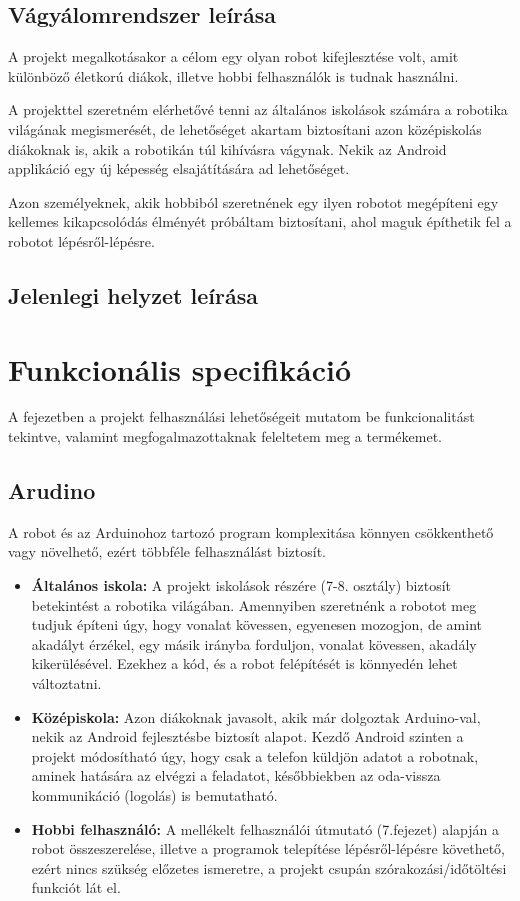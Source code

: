 \documentclass[]{thesis-ekf}
\theoremstyle{definition}
\begin{document}
\section{Vágyálomrendszer leírása}\label{követelmény}
A projekt megalkotásakor a célom egy olyan robot kifejlesztése volt, amit különböző életkorú diákok, illetve hobbi felhasználók is tudnak használni.

A projekttel szeretném elérhetővé tenni az általános iskolások számára a robotika világának megismerését, de lehetőséget akartam biztosítani azon középiskolás diákoknak is, akik a robotikán túl kihívásra vágynak. Nekik az Android applikáció egy új képesség elsajátítására ad lehetőséget.

Azon személyeknek, akik hobbiból szeretnének egy ilyen robotot megépíteni egy kellemes kikapcsolódás élményét próbáltam biztosítani, ahol maguk építhetik fel a robotot lépésről-lépésre.
\section{Jelenlegi helyzet leírása}\label{jelenlegi_helyzet}
\chapter{Funkcionális specifikáció}
A fejezetben a projekt felhasználási lehetőségeit mutatom be funkcionalitást tekintve, valamint   megfogalmazottaknak feleltetem meg a termékemet.
\section{Arudino}
A robot és az Arduinohoz tartozó program komplexitása könnyen csökkenthető vagy növelhető, ezért többféle felhasználást biztosít.
\begin{itemize}
	\item \textbf{Általános iskola:} A projekt iskolások részére (7-8. osztály) biztosít betekintést a robotika világában. Amennyiben szeretnénk a robotot meg tudjuk építeni úgy, hogy vonalat kövessen, egyenesen mozogjon, de amint akadályt érzékel, egy másik irányba forduljon, vonalat kövessen, akadály kikerülésével. Ezekhez a kód, és a robot felépítését is könnyedén lehet változtatni.
	\item \textbf{Középiskola:} Azon diákoknak javasolt, akik már dolgoztak Arduino-val, nekik az Android fejlesztésbe biztosít alapot. Kezdő Android szinten a projekt módosítható úgy, hogy csak a telefon küldjön adatot a robotnak, aminek hatására az elvégzi a feladatot, későbbiekben az oda-vissza kommunikáció (logolás) is bemutatható.
	\item \textbf{Hobbi felhasználó:} A mellékelt felhasználói útmutató (7.fejezet) alapján a robot összeszerelése, illetve a programok telepítése lépésről-lépésre követhető, ezért nincs szükség előzetes ismeretre, a projekt csupán szórakozási/időtöltési funkciót lát el.
\end{itemize}
\end{document}
